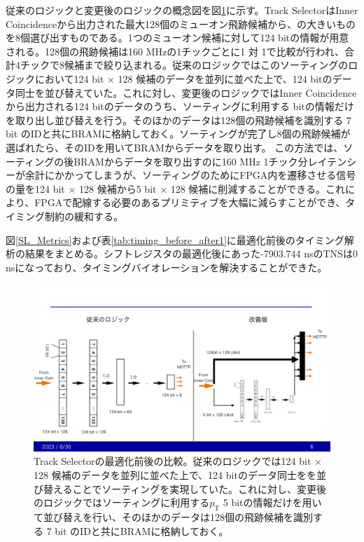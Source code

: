 従来のロジックと変更後のロジックの概念図を図\ref{TrackSele_ba}に示す。Track SelectorはInner Coincidenceから出力された最大128個のミューオン飛跡候補から、\pt の大きいものを8個選び出すものである。1つのミューオン候補に対して124 bitの情報が用意される。128個の飛跡候補は160 MHzの1チックごとに1 対 1で\pt 比較が行われ、合計4チックで8候補まで絞り込まれる。従来のロジックではこのソーティングのロジックにおいて124 bit $\times$ 128 候補のデータを並列に並べた上で、124 bitのデータ同士を並び替えていた。これに対し、変更後のロジックではInner Coincidenceから出力される124 bitのデータのうち、ソーティングに利用する bitの情報だけを取り出し並び替えを行う。そのほかのデータは128個の飛跡候補を識別する 7 bit のIDと共にBRAMに格納しておく。ソーティングが完了し8個の飛跡候補が選ばれたら、そのIDを用いてBRAMからデータを取り出す。
この方法では、ソーティングの後BRAMからデータを取り出すのに160 MHz 1チック分レイテンシーが余計にかかってしまうが、ソーティングのためにFPGA内を遷移させる信号の量を124 bit $\times$ 128 候補から5 bit $\times$ 128 候補に削減することができる。これにより、FPGAで配線する必要のあるプリミティブを大幅に減らすことができ、タイミング制約の緩和する。

図\ref{SL_Metrics}および表\ref{tab:timing_before_after1}に最適化前後のタイミング解析の結果をまとめる。シフトレジスタの最適化後にあった-7903.744 nsのTNSは0 nsになっており、タイミングバイオレーションを解決することができた。

\begin{figure} 
\centering
\includegraphics[width=16cm]{fig/SL/TrackSele_ba.pdf}
\caption[Track Selectorの最適化前後の比較]{Track Selectorの最適化前後の比較。従来のロジックでは124 bit $\times$ 128 候補のデータを並列に並べた上で、124 bitのデータ同士をを並び替えることでソーティングを実現していた。これに対し、変更後のロジックではソーティングに利用する$p_\mathrm{T}$ 5 bitの情報だけを用いて並び替えを行い、そのほかのデータは128個の飛跡候補を識別する 7 bit のIDと共にBRAMに格納しておく。}
\label{TrackSele_ba}
\end{figure}


